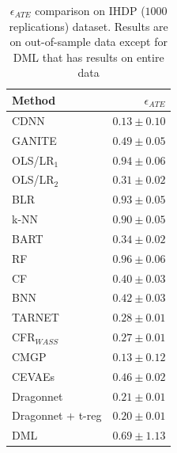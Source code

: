 \documentclass[sigconf]{acmart}
\theoremstyle{plain}
\numberwithin{equation}{section}
\begin{document}
\begin{center}
	\begin{table}[h]
		\centering
		\caption{$\epsilon_{ATE}$ comparison on IHDP ($1000$ replications) dataset. Results are on out-of-sample data except for DML that has results on entire data}
		\label{table:ATE_PEHE_IHDP}
		\begin{tabular}{|l|r|}
			\hline
			Method &$\epsilon_{ATE}$ \\ 
			\hline
			CDNN & $\bm{0.13}\pm0.10$\\
			\hline
			GANITE &  $0.49\pm0.05$\\
			OLS/LR$_1$&  $0.94\pm0.06$\\
			OLS/LR$_2$&  $0.31\pm0.02$\\
			BLR&  $0.93\pm0.05$ \\
			k-NN&   $0.90\pm0.05$ \\
			BART& $0.34\pm0.02$\\
			RF& $0.96\pm0.06$ \\
			CF& $0.40\pm0.03$ \\
			BNN& $0.42\pm0.03$ \\
			TARNET&  $0.28\pm0.01$ \\
			CFR$_{W ASS}$& $0.27\pm0.01$ \\
			CMGP& $\bm{0.13}\pm0.12$\\
			CEVAEs&  $0.46\pm0.02$\\
			Dragonnet &  $0.21\pm0.01$ \\
			Dragonnet + t-reg&  $0.20\pm0.01$\\
			DML  & $0.69\pm1.13$\\ 
			\hline			
		\end{tabular}
	\end{table}
\end{center}
\end{document}

